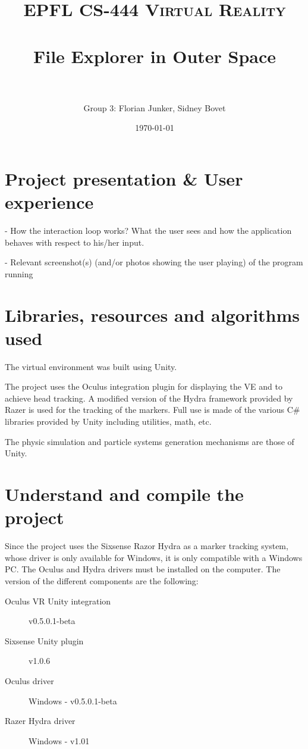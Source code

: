 \documentclass[paper=a4, fontsize=11pt]{scrartcl} %
\title{
	\normalfont \normalsize
	\textsc{EPFL CS-444 Virtual Reality} \\ [25pt] %
	\horrule{0.5pt} \\[0.4cm] %
	\huge File Explorer in Outer Space \\ %
	\horrule{2pt} \\[0.5cm] %
}
\author{Group 3: Florian Junker, Sidney Bovet} %
\date{\normalsize\today} %
\numberwithin{equation}{section} %
\numberwithin{figure}{section} %
\numberwithin{table}{section} %
\begin{document}
	
	\maketitle %
	
	
	
	
	\section{Project presentation \& User experience}
	- How the interaction loop works? What the user sees and how the application behaves with respect to his/her input.
	
	- Relevant screenshot(s) (and/or photos showing the user playing) of the program running
	
	
	\section{Libraries, resources and algorithms used}
	The virtual environment was built using Unity.
	
	The project uses the Oculus integration plugin for displaying the VE and to achieve head tracking. A modified version of the Hydra framework provided by Razer is used for the tracking of the markers. Full use is made of the various C\# libraries provided by Unity including utilities, math, etc.
	
	The physic simulation and particle systems generation mechanisms are those of Unity.
	
	
	\section{Understand and compile the project}
	Since the project uses the Sixsense Razor Hydra as a marker tracking system, whose driver is only available for Windows, it is only compatible with a Windows PC. The Oculus and Hydra drivers must be installed on the computer. The version of the different components are the following:
	\begin{description}
		\item[Oculus VR Unity integration] v0.5.0.1-beta
		\item[Sixsense Unity plugin] v1.0.6
		\item[Oculus driver] Windows - v0.5.0.1-beta
		\item[Razer Hydra driver] Windows - v1.01
	\end{description}
	
\end{document}
